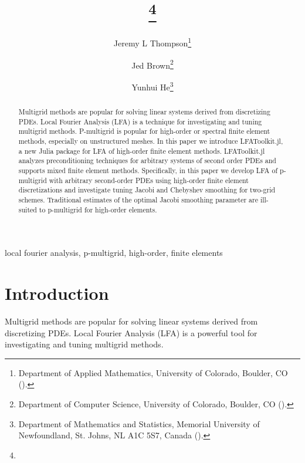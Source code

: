 \documentclass[review]{siamart190516}
\author{
Jeremy L Thompson\thanks{Department of Applied Mathematics, University of Colorado, Boulder, CO
  (\email{jeremy@jeremylt.org}).}
\and Jed Brown\thanks{Department of Computer Science, University of Colorado, Boulder, CO
  (\email{jed@jedbrown.org}).}
\and Yunhui He\thanks{Department of Mathematics and Statistics, Memorial University of Newfoundland, St. Johns, NL A1C 5S7, Canada
  (\email{yunhui.he@mun.ca}).}
}
\title{{\TheTitle}\thanks{\TheFunding}}
\begin{document}
\maketitle

\vspace{1cm}

\begin{abstract}
Multigrid methods are popular for solving linear systems derived from discretizing PDEs.
Local Fourier Analysis (LFA) is a technique for investigating and tuning multigrid methods.
P-multigrid is popular for high-order or spectral finite element methods, especially on unstructured meshes.
In this paper we introduce LFAToolkit.jl, a new Julia package for LFA of high-order finite element methods.
LFAToolkit.jl analyzes preconditioning techniques for arbitrary systems of second order PDEs and supports mixed finite element methods.
Specifically, in this paper we develop LFA of p-multigrid with arbitrary second-order PDEs using high-order finite element discretizations and investigate tuning Jacobi and Chebyshev smoothing for two-grid schemes.
Traditional estimates of the optimal Jacobi smoothing parameter are ill-suited to p-multigrid for high-order elements.
\end{abstract}

\begin{keywords}
  local fourier analysis, p-multigrid, high-order, finite elements
\end{keywords}

\section{Introduction}\label{sec:intro}

Multigrid methods \cite{brandt1982guide, briggs2000multigrid, stuben1982multigrid} are popular for solving linear systems derived from discretizing PDEs.
Local Fourier Analysis (LFA) \cite{brandt1977multi, wienands2004practical} is a powerful tool for investigating and tuning multigrid methods.
\end{document}

